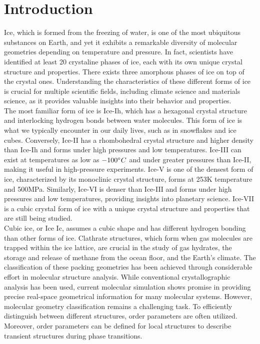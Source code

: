 \chapter{Introduction}
 \setcounter{page}{1}

Ice, which is formed from the freezing of water, is one of the most ubiquitous substances on Earth, and yet it exhibits a remarkable diversity of molecular geometries depending on temperature and pressure\cite{Zheligovskaya2006}. In fact, scientists have identified at least 20 crystaline phases of ice, each with its own unique crystal structure and properties\cite{BartelsRausch2012}\cite{Fuentes-Landete}. There exists three amorphous phases of ice on top of the crystal ones\cite{Fuentes-Landete}. Understanding the characteristics of these different forms of ice is crucial for multiple scientific fields, including climate science and materials science, as it provides valuable insights into their behavior and properties.\\
The most familiar form of ice is Ice-Ih, which has a hexagonal crystal structure and interlocking hydrogen bonds between water molecules. This form of ice is what we typically encounter in our daily lives, such as in snowflakes and ice cubes\cite{Baker2019}. Conversely, Ice-II has a rhombohedral crystal structure and higher density than Ice-Ih and forms under high pressures and low temperatures\cite{Kamb1964}. Ice-III can exist at temperatures as low as $-100 \degree C$ and under greater pressures than Ice-II, making it useful in high-pressure experiments\cite{Bauer_2008}. Ice-V is one of the densest form of ice, characterized by its monoclinic crystal structure, forms at 253K temperature and 500MPa\cite{Hasted_1969}. Similarly, Ice-VI is denser than Ice-III and forms under high pressures and low temperatures, providing insights into planetary science\cite{Kuhs_1984}. Ice-VII is a cubic crystal form of ice with a unique crystal structure and properties that are still being studied\cite{Kuhs_1984}.\\
Cubic ice, or Ice Ic, assumes a cubic shape and has different hydrogen bonding than other forms of ice\cite{Murray_2006}. Clathrate structures, which form when gas molecules are trapped within the ice lattice, are crucial in the study of gas hydrates, the storage and release of methane from the ocean floor, and the Earth's climate\cite{Buffett2004}\cite{Buchanan2005}. The classification of these packing geometries has been achieved through considerable effort in molecular structure analysis. While conventional crystallographic analysis has been used, current molecular simulation shows promise in providing precise real-space geometrical information for many molecular systems. However, molecular geometry classification remains a challenging task. To efficiently distinguish between different structures, order parameters are often utilized\cite{CHAU_1998}\cite{Giovambattista_2005}\cite{Yan_2007}\cite{Zimmermann2017}\cite{Yan2007}\cite{Errington2001}\cite{Piaggi2017}\cite{Lechner2008}\cite{Reinhardt2012}\cite{Mickel2013}. Moreover, order parameters can be defined for local structures to describe transient structures during phase transitions.\\
